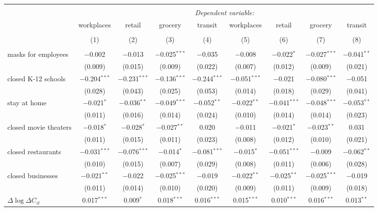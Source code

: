 \begin{tabular}{@{\extracolsep{1pt}}lcccccccc} 
\\[-1.8ex]\hline 
\hline \\[-1.8ex] 
 & \multicolumn{8}{c}{\textit{Dependent variable:}} \\ 
\cline{2-9} 
 & workplaces & retail & grocery & transit & workplaces & retail & grocery & transit \\ 
\\[-1.8ex] & (1) & (2) & (3) & (4) & (5) & (6) & (7) & (8)\\ 
\hline \\[-1.8ex] 
 masks for employees & $-$0.002 & $-$0.013 & $-$0.025$^{***}$ & $-$0.035 & $-$0.008 & $-$0.022$^{*}$ & $-$0.027$^{***}$ & $-$0.041$^{**}$ \\ 
  & (0.009) & (0.015) & (0.009) & (0.022) & (0.007) & (0.012) & (0.009) & (0.021) \\ 
  closed K-12 schools & $-$0.204$^{***}$ & $-$0.231$^{***}$ & $-$0.136$^{***}$ & $-$0.244$^{***}$ & $-$0.051$^{***}$ & $-$0.021 & $-$0.080$^{***}$ & $-$0.051 \\ 
  & (0.028) & (0.043) & (0.025) & (0.053) & (0.014) & (0.018) & (0.029) & (0.041) \\ 
  stay at home & $-$0.021$^{*}$ & $-$0.036$^{**}$ & $-$0.049$^{***}$ & $-$0.052$^{**}$ & $-$0.022$^{**}$ & $-$0.041$^{***}$ & $-$0.048$^{***}$ & $-$0.053$^{**}$ \\ 
  & (0.011) & (0.016) & (0.014) & (0.024) & (0.010) & (0.014) & (0.014) & (0.023) \\ 
  closed movie theaters & $-$0.018$^{*}$ & $-$0.028$^{*}$ & $-$0.027$^{**}$ & 0.020 & $-$0.011 & $-$0.021$^{*}$ & $-$0.023$^{**}$ & 0.031 \\ 
  & (0.011) & (0.015) & (0.011) & (0.023) & (0.008) & (0.012) & (0.010) & (0.021) \\ 
  closed restaurants & $-$0.031$^{***}$ & $-$0.076$^{***}$ & $-$0.014$^{*}$ & $-$0.081$^{***}$ & $-$0.015$^{*}$ & $-$0.051$^{***}$ & $-$0.009 & $-$0.062$^{**}$ \\ 
  & (0.010) & (0.015) & (0.007) & (0.029) & (0.008) & (0.011) & (0.006) & (0.028) \\ 
  closed businesses & $-$0.021$^{**}$ & $-$0.022 & $-$0.025$^{***}$ & $-$0.019 & $-$0.022$^{**}$ & $-$0.025$^{**}$ & $-$0.025$^{***}$ & $-$0.019 \\ 
  & (0.011) & (0.014) & (0.010) & (0.020) & (0.009) & (0.011) & (0.009) & (0.018) \\ 
  $\Delta \log \Delta C_{it}$ & 0.017$^{***}$ & 0.009$^{*}$ & 0.018$^{***}$ & 0.016$^{***}$ & 0.015$^{***}$ & 0.010$^{***}$ & 0.016$^{***}$ & 0.013$^{**}$ \\ 

\end{tabular}
